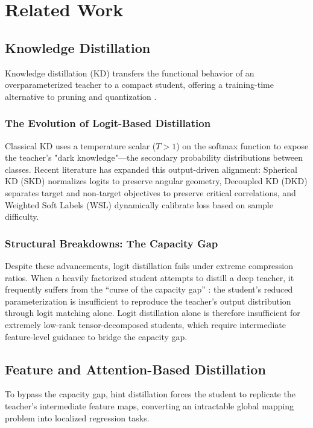 \documentclass[conference]{IEEEtran}
\begin{document}
\section{Related Work}
\label{sec:related}


\subsection{Knowledge Distillation}
\par
Knowledge distillation (KD) \cite{hinton2015distilling} transfers the
functional behavior of an overparameterized teacher to a compact student,
offering a training-time alternative to pruning \cite{han2015deep} and
quantization \cite{jacob2018quantization}.


\subsubsection{The Evolution of Logit-Based Distillation}
\par
Classical KD uses a temperature scalar ($T>1$) on the softmax function to expose the teacher's "dark knowledge"—the secondary probability distributions between classes. Recent literature has expanded this output-driven alignment: Spherical KD (SKD) \cite{guo2021reducingteacherstudentgapspherical} normalizes logits to preserve angular geometry, Decoupled KD (DKD) \cite{zhao2022decoupled} separates target and non-target objectives to preserve critical correlations, and Weighted Soft Labels (WSL) \cite{zhou2021rethinking} dynamically calibrate loss based on sample difficulty.


\subsubsection{Structural Breakdowns: The Capacity Gap}
\par
Despite these advancements, logit distillation fails under extreme compression ratios. When a heavily factorized student attempts to distill a deep teacher, it
frequently suffers from the ``curse of the capacity gap''
\cite{mirzadeh2020improved}: the student's reduced parameterization is
insufficient to reproduce the teacher's output distribution through logit
matching alone. Logit distillation alone is therefore insufficient for extremely low-rank tensor-decomposed students, which require intermediate feature-level guidance to bridge the capacity gap.


\subsection{Feature and Attention-Based Distillation}
\par
To bypass the capacity gap, hint distillation forces the student to replicate the teacher's intermediate feature maps, converting an intractable global mapping problem into localized regression tasks.
\end{document}
